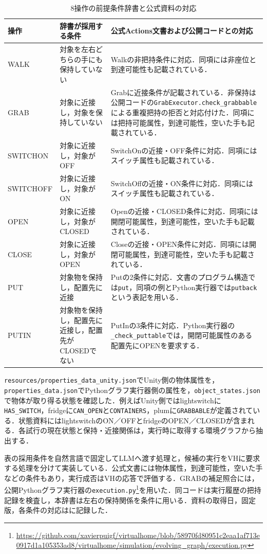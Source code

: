 \begin{table}[tb]
\caption{8操作の前提条件辞書と公式資料の対応}\label{tab:condition_source_scope}
\centering\scriptsize\setlength{\tabcolsep}{3pt}
\begin{tabular}{p{}p{}p{}}
\hline
操作 & 辞書が採用する条件 & 公式Actions文書および公開コードとの対応 \\
\hline
WALK & 対象を左右どちらの手にも保持していない & Walkの非把持条件に対応．同項には非座位と到達可能性も記載されている． \\
GRAB & 対象に近接し，対象を保持していない & Grabに近接条件が記載されている．非保持は公開コードの\texttt{GrabExecutor.check\_grabbable}による重複把持の拒否と対応付けた．同項には把持可能属性，到達可能性，空いた手も記載されている． \\
SWITCHON & 対象に近接し，対象がOFF & SwitchOnの近接・OFF条件に対応．同項にはスイッチ属性も記載されている． \\
SWITCHOFF & 対象に近接し，対象がON & SwitchOffの近接・ON条件に対応．同項にはスイッチ属性も記載されている． \\
OPEN & 対象に近接し，対象がCLOSED & Openの近接・CLOSED条件に対応．同項には開閉可能属性，到達可能性，空いた手も記載されている． \\
CLOSE & 対象に近接し，対象がOPEN & Closeの近接・OPEN条件に対応．同項には開閉可能属性，到達可能性，空いた手も記載されている． \\
PUT & 対象物を保持し，配置先に近接 & Putの2条件に対応．文書のプログラム構造では\texttt{put}，同項の例とPython実行器では\texttt{putback}という表記を用いる． \\
PUTIN & 対象物を保持し，配置先に近接し，配置先がCLOSEDでない & PutInの3条件に対応．Python実行器の\texttt{\_check\_puttable}では，開閉可能属性のある配置先にOPENを要求する． \\
\hline
\end{tabular}
\end{table}

\texttt{resources/properties\_data\_unity.json}でUnity側の物体属性を，\texttt{properties\_data.json}でPythonグラフ実行器側の属性を，\texttt{object\_states.json}で物体が取り得る状態を確認した．例えばUnity側ではlightswitchに\texttt{HAS\_SWITCH}，fridgeに\texttt{CAN\_OPEN}と\texttt{CONTAINERS}，plumに\texttt{GRABBABLE}が定義されている．状態資料にはlightswitchのON／OFFとfridgeのOPEN／CLOSEDが含まれる．各試行の現在状態と保持・近接関係は，実行時に取得する環境グラフから抽出する．

表の採用条件を自然言語で固定してLLMへ渡す処理と，候補の実行をVHに要求する処理を分けて実装している．公式文書には物体属性，到達可能性，空いた手などの条件もあり，実行成否はVHの応答で評価する．GRABの補足照合には，公開Pythonグラフ実行器の\texttt{execution.py}\footnote{\url{https://github.com/xavierpuigf/virtualhome/blob/58970fd80951c2eaa1af713e0917d1a105353ad8/virtualhome/simulation/evolving_graph/execution.py}}を用いた．同コードは実行履歴の把持記録を検査し，本辞書は左右の保持関係を条件に用いる．資料の取得日，固定版，各条件の対応はに記録した．

